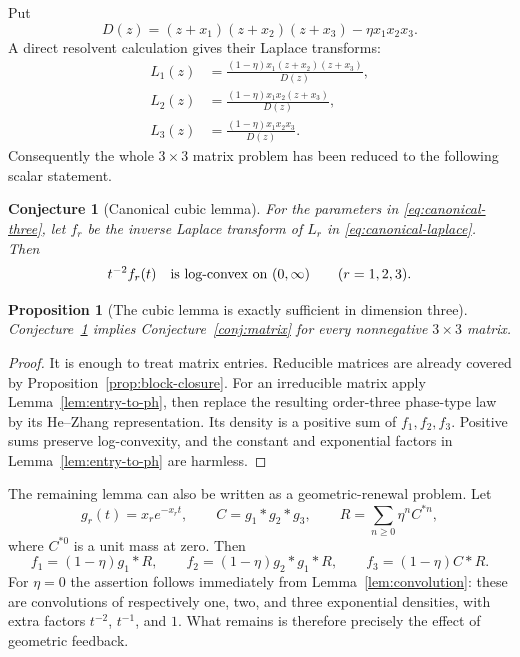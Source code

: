 \documentclass[11pt]{article}
\newtheorem{proposition}[theorem]{Proposition}
\newtheorem{conjecture}[theorem]{Conjecture}
\theoremstyle{remark}
\begin{document}
Put
\[
 D(z)=(z+x_1)(z+x_2)(z+x_3)-\eta x_1x_2x_3.
\]
A direct resolvent calculation gives their Laplace transforms:
\begin{equation}\label{eq:canonical-laplace}
 \begin{aligned}
 L_1(z)&=\frac{(1-\eta)x_1(z+x_2)(z+x_3)}{D(z)},\\
 L_2(z)&=\frac{(1-\eta)x_1x_2(z+x_3)}{D(z)},\\
 L_3(z)&=\frac{(1-\eta)x_1x_2x_3}{D(z)}.
 \end{aligned}
\end{equation}
Consequently the whole $3\times3$ matrix problem has been reduced to the
following scalar statement.

\begin{conjecture}[Canonical cubic lemma]\label{conj:canonical-cubic}
For the parameters in \eqref{eq:canonical-three}, let $f_r$ be the inverse
Laplace transform of $L_r$ in \eqref{eq:canonical-laplace}.  Then
\[
 t^{-2}f_r(t)\quad\hbox{is log-convex on $(0,\infty)$}
 \qquad(r=1,2,3).
\]
\end{conjecture}

\begin{proposition}[The cubic lemma is exactly sufficient in dimension three]
\label{prop:three-reduction}
Conjecture~\ref{conj:canonical-cubic} implies
Conjecture~\ref{conj:matrix} for every nonnegative $3\times3$ matrix.
\end{proposition}

\begin{proof}
It is enough to treat matrix entries.  Reducible matrices are already covered
by Proposition~\ref{prop:block-closure}.  For an irreducible matrix apply
Lemma~\ref{lem:entry-to-ph}, then replace the resulting order-three
phase-type law by its He--Zhang representation.  Its density is a positive
sum of $f_1,f_2,f_3$.  Positive sums preserve log-convexity, and the constant
and exponential factors in Lemma~\ref{lem:entry-to-ph} are harmless.
\end{proof}

The remaining lemma can also be written as a geometric-renewal problem.  Let
\[
 g_r(t)=x_re^{-x_rt},\qquad C=g_1*g_2*g_3,
 \qquad R=\sum_{n\geq0}\eta^n C^{*n},
\]
where $C^{*0}$ is a unit mass at zero.  Then
\begin{equation}\label{eq:canonical-renewal}
 f_1=(1-\eta)g_1*R,\qquad
 f_2=(1-\eta)g_2*g_1*R,\qquad
 f_3=(1-\eta)C*R.
\end{equation}
For $\eta=0$ the assertion follows immediately from
Lemma~\ref{lem:convolution}: these are convolutions of respectively one, two,
and three exponential densities, with extra factors $t^{-2}$, $t^{-1}$, and
$1$.  What remains is therefore precisely the effect of geometric feedback.
\end{document}
